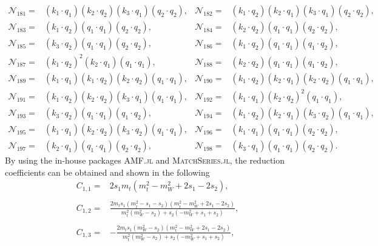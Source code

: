 \documentclass[twocolumn,aps,showpacs,nofootinbib,superscriptaddress,prd]{revtex4-2}
\begin{document}
\begin{widetext}
\begin{align}
{\mathcal N}_{181}=&(k_1\cdot q_1) (k_2\cdot q_2) (k_3\cdot q_1) (q_2\cdot q_2),&
{\mathcal N}_{182}=&(k_1\cdot q_2) (k_2\cdot q_1) (k_3\cdot q_1) (q_2\cdot q_2),\nonumber\\
{\mathcal N}_{183}=&(k_1\cdot q_2) (q_1\cdot q_1) (q_2\cdot q_2),&
{\mathcal N}_{184}=&(k_2\cdot q_2) (q_1\cdot q_1) (q_2\cdot q_2),\nonumber\\
{\mathcal N}_{185}=&(k_3\cdot q_2) (q_1\cdot q_1) (q_2\cdot q_2),&
{\mathcal N}_{186}=&(k_1\cdot q_2) (q_1\cdot q_1) (q_1\cdot q_2),\nonumber\\
{\mathcal N}_{187}=&(k_1\cdot q_2)^2 (k_2\cdot q_1) (q_1\cdot q_1),&
{\mathcal N}_{188}=&(k_2\cdot q_2) (q_1\cdot q_1) (q_1\cdot q_2),\nonumber\\
{\mathcal N}_{189}=&(k_1\cdot q_1) (k_1\cdot q_2) (k_2\cdot q_2) (q_1\cdot q_1),&
{\mathcal N}_{190}=&(k_1\cdot q_2) (k_2\cdot q_1) (k_2\cdot q_2) (q_1\cdot q_1),\nonumber\\
{\mathcal N}_{191}=&(k_1\cdot q_2) (k_2\cdot q_2) (k_3\cdot q_1) (q_1\cdot q_1),&
{\mathcal N}_{192}=&(k_1\cdot q_1) (k_2\cdot q_2)^2 (q_1\cdot q_1),\nonumber\\
{\mathcal N}_{193}=&(k_3\cdot q_2) (q_1\cdot q_1) (q_1\cdot q_2),&
{\mathcal N}_{194}=&(k_1\cdot q_2) (k_2\cdot q_1) (k_3\cdot q_2) (q_1\cdot q_1),\nonumber\\
{\mathcal N}_{195}=&(k_1\cdot q_1) (k_2\cdot q_2) (k_3\cdot q_2) (q_1\cdot q_1),&
{\mathcal N}_{196}=&(k_1\cdot q_1) (q_1\cdot q_1) (q_2\cdot q_2),\nonumber\\
{\mathcal N}_{197}=&(k_2\cdot q_1) (q_1\cdot q_1) (q_2\cdot q_2),&
{\mathcal N}_{198}=&(k_3\cdot q_1) (q_1\cdot q_1) (q_2\cdot q_2).
\end{align}
By using the in-house packages \textsc{AMF.jl} and \textsc{MatchSeries.jl}, the reduction coefficients can be obtained and shown in the following
\begin{align}
C_{1,1}=&2s_1m_t\left(m_t^2-m_W^2+2s_1-2s_2\right)
,\nonumber\\
\nonumber\\
C_{1,2}=&\frac{2m_ts_1\left(m_t^2-s_1-s_2\right)\left(m_t^2-m_W^2+2s_1-2s_2\right)}{m_t^2\left(m_W^2-s_2\right)+s_2
\left(-m_W^2+s_1+s_2\right)}
,\nonumber\\
\nonumber\\
C_{1,3}=&-\frac{2m_ts_1\left(m_W^2-s_2\right)\left(m_t^2-m_W^2+2s_1-2s_2\right)}{m_t^2\left(m_W^2-s_2\right)+s_2
\left(-m_W^2+s_1+s_2\right)}
,\nonumber\\
\nonumber\\

\end{align}
\end{widetext}
\end{document}
